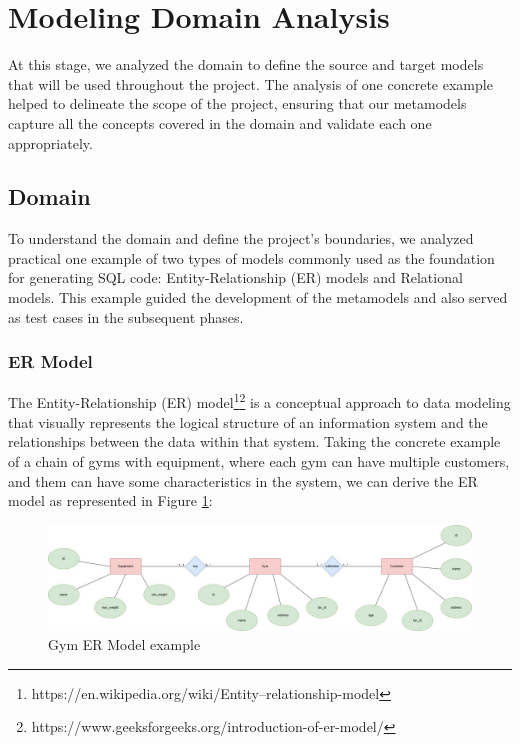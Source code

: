 \documentclass[10pt]{article}
\begin{document}
\section{Modeling Domain Analysis}

At this stage, we analyzed the domain to define the source and target models that will be used throughout the project. The analysis of one concrete example helped to delineate the scope of the project, ensuring that our metamodels capture all the concepts covered in the domain and validate each one appropriately.

\subsection{Domain}

To understand the domain and define the project's boundaries, we analyzed practical one example of two types of models commonly used as the foundation for generating SQL code: Entity-Relationship (ER) models and Relational models. This example guided the development of the metamodels and also served as test cases in the subsequent phases.

\subsubsection{ER Model}

The Entity-Relationship (ER) model\footnote{https://en.wikipedia.org/wiki/Entity–relationship-model}\footnote{https://www.geeksforgeeks.org/introduction-of-er-model/} is a conceptual approach to data modeling that visually represents the logical structure of an information system and the relationships between the data within that system. Taking the concrete example of a chain of gyms with equipment, where each gym can have multiple customers, and them can have some characteristics in the system, we can derive the ER model as represented in Figure \ref{figure1}:

\begin{center}
    \begin{figure}[H]
        \centering
        \includegraphics[width=1.0\textwidth]{imgs/er-model.png}
            \caption{Gym ER Model example}
        \label{figure1}
    \end{figure}
\end{center}
\end{document}
